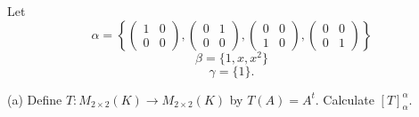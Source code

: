 \documentclass{article}
\begin{document}
	
	Let
	\[
	\alpha = 
	\left\{
	\begin{pmatrix}
		1 & 0 \\
		0 & 0
	\end{pmatrix},
	\begin{pmatrix}
		0 & 1 \\
		0 & 0
	\end{pmatrix},
	\begin{pmatrix}
		0 & 0 \\
		1 & 0
	\end{pmatrix},
	\begin{pmatrix}
		0 & 0 \\
		0 & 1
	\end{pmatrix}
	\right\}
	\]
	\[
	\beta = \{1, x, x^2\}
	\]
	\[
	\gamma = \{1\}.
	\]
	
	(a) Define \( T: M_{2\times2} (K) \to M_{2\times2} (K) \) by \( T(A) = A^t \). Calculate \([T]_{\alpha}^{\alpha}\).
	
\end{document}

